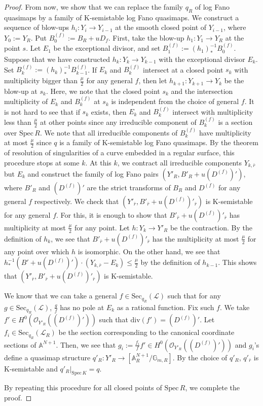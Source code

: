 \documentclass[12pt,twoside]{amsart}
\theoremstyle{definition}
\begin{document}
\begin{proof}
From now, we show that we can replace the family $q_R$ of log Fano quasimaps by a family of K-semistable log Fano quasimaps.
We construct a sequence of blow-ups $h_i\colon Y_i\to Y_{i-1}$ at the smooth closed point of $Y_{i-1}$, where $Y_0:=Y_R$. 
Put $B_0^{(f)}:=B_R+uD_f$. 
First, take the blow-up $h_1\colon Y_1\to Y_R$ at the point $s$.
Let $E_1$ be the exceptional divisor, and set $B_1^{(f)}:=(h_1)_{*}^{-1}B_0^{(f)}$.
Suppose that we have constructed $h_k\colon Y_k\to Y_{k-1}$ with the exceptional divisor $E_k$. 
Set $B_k^{(f)}:=(h_{k})_{*}^{-1}B^{(f)}_{k-1}$.
If $E_k$ and $B_k^{(f)}$ intersect at a closed point $s_k$ with multiplicity bigger than $\frac{\mu}{2}$ for any general $f$, then let $h_{k+1}\colon Y_{k+1}\to Y_k$ be the blow-up at $s_k$.
Here, we note that the closed point $s_{k}$ and the intersection multiplicity of $E_k$ and $B_k^{(f)}$ at $s_k$ is independent from the choice of general $f$. 
It is not hard to see that if $s_k$ exists, then $E_k$ and $B_k^{(f)}$ intersect  with multiplicity less than $\frac{\mu}{2}$ at other points since any irreducible component of $B_k^{(f)}$ is a section over $\mathrm{Spec}\, R$. 
We note that all irreducible components of $B_k^{(f)}$ have multiplicity at most $\frac{\mu}{2}$ since $q$ is a family of K-semistable log Fano quasimaps.
By the theorem of resolution of singularities of a curve embedded in a regular surface, this procedure stops at some $k$. 
At this $k$, we contract all irreducible components $Y_{k,\bar{r}}$ but $E_k$ and construct the family of log Fano pairs $(Y'_R,B'_R+u(D^{(f)})')$, where $B'_R$ and $(D^{(f)})'$ are the strict transforms of $B_R$ and $D^{(f)}$ for any general $f$ respectively.
We check that $(Y'_{\bar{r}},B'_{\bar{r}}+u(D^{(f)})'_{\bar{r}})$ is K-semistable for any general $f$.
For this, it is enough to show that $B'_{\bar{r}}+u(D^{(f)})'_{\bar{r}}$ has multiplicity at most $\frac{\mu}{2}$ for any point.
Let $h\colon Y_k\to Y'_R$ be the contraction.
By the definition of $h_k$, we see that $B'_{\bar{r}}+u(D^{(f)})'_{\bar{r}}$ has the multiplicity at most $\frac{\mu}{2}$ for any point over which $h$ is isomorphic.
On the other hand, we see that $h_{*}^{-1}(B'+u(D^{(f)})')\cdot (Y_{k,\bar{r}}-E_k)\le \frac{\mu}{2}$ by the definition of $h_{k-1}$.
This shows that $(Y'_{\bar{r}},B'_{\bar{r}}+u(D^{(f)})'_{\bar{r}})$ is K-semistable.


We know that we can take a general $f\in \mathrm{Sec}_{q_R}(\mathscr{L})$ such that for any $g\in\mathrm{Sec}_{q_R}(\mathscr{L})$, $\frac{g}{f}$ has no pole at $E_k$ as a rational function.
Fix such $f$.
We take $f'\in H^0(\mathcal{O}_{Y'_R}((D^{(f)})'))$ such that $\mathrm{div}(f')=(D^{(f)})'$. 
Let $f_i\in\mathrm{Sec}_{q_R}(\mathscr{L}_R)$ be the section corresponding to the canonical coordinate sections of $\mathbb{A}^{N+1}$.
Then, we see that $g_i:=\frac{f_i}{f}f'\in H^0(\mathcal{O}_{Y'_R}((D^{(f)})'))$ and $g_i$'s  define a quasimap structure $q'_R\colon Y'_R\to[\mathbb{A}_R^{N+1}/\mathbb{G}_{m,R}]$.
By the choice of $q'_R$, $q'_{\bar{r}}$ is K-semistable and $q'_R|_{\mathrm{Spec}\,K}=q$. 

By repeating this procedure for all closed points of $\mathrm{Spec}\,R$, we complete the proof.
\end{proof}
\end{document}
